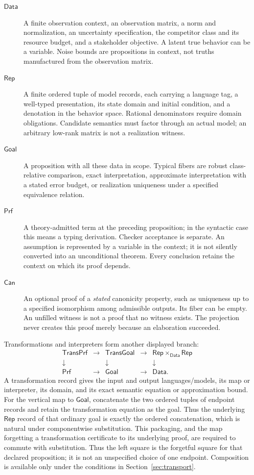 \documentclass[11pt]{article}
\newcommand{\Cat}[1]{\mathsf{#1}}
\begin{document}
\begin{description}
\item[$\Cat{Data}$] A finite observation context, an observation matrix,
a norm and normalization, an uncertainty specification, the competitor
class and its resource budget, and a stakeholder objective. A latent true
behavior can be a variable. Noise bounds are propositions in context,
not truths manufactured from the observation matrix.
\item[$\Cat{Rep}$] A finite ordered tuple of model records, each carrying a language tag,
a well-typed presentation, its state domain and initial condition, and a denotation in the behavior
space. Rational denominators require domain obligations. Candidate
semantics must factor through an actual model; an arbitrary low-rank
matrix is not a realization witness.
\item[$\Cat{Goal}$] A proposition with all these data in scope. Typical
fibers are robust class-relative comparison, exact interpretation,
approximate interpretation with a stated error budget, or realization
uniqueness under a specified equivalence relation.
\item[$\Cat{Prf}$] A theory-admitted term at the preceding proposition; in the syntactic
case this means a typing derivation. Checker acceptance is separate. An
assumption is represented by a variable in the context; it is not silently
converted into an unconditional theorem. Every conclusion retains the
context on which its proof depends.
\item[$\Cat{Can}$] An optional proof of a \emph{stated} canonicity property,
such as uniqueness up to a specified isomorphism among admissible outputs.
Its fiber can be empty. An unfilled witness is not a proof that no witness
exists. The projection never creates this proof merely because an
elaboration succeeded.
\end{description}
Transformations and interpreters form another displayed branch:
\[
\begin{array}{ccccc}
 \Cat{TransPrf}&\longrightarrow&\Cat{TransGoal}
   &\longrightarrow&\Cat{Rep}\mathbin{\times_{\Cat{Data}}}\Cat{Rep}\\
 \downarrow&&\downarrow&&\downarrow\\
 \Cat{Prf}&\longrightarrow&\Cat{Goal}&\longrightarrow&\Cat{Data}.
\end{array}                                                     \tag{D2}
\]
A transformation record gives the input and output languages/models,
its map or interpreter, its domain, and its exact semantic equation or
approximation bound. For the vertical map to $\Cat{Goal}$, concatenate the two ordered tuples
of endpoint records and retain the transformation equation as the goal.
Thus the underlying $\Cat{Rep}$ record of that ordinary goal is exactly
the ordered concatenation, which is natural under componentwise substitution.
This packaging, and the map forgetting a transformation certificate to
its underlying proof, are required to commute with substitution. Thus the
left square is the forgetful square for that declared proposition; it
is not an unspecified choice of one endpoint.
Composition is available only under the conditions in Section~\ref{sec:transport}.
\end{document}

